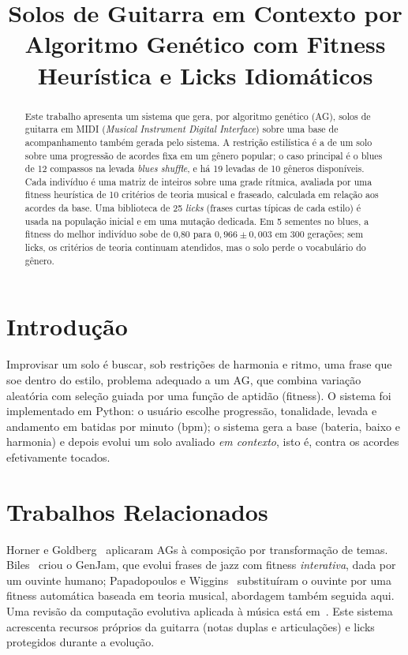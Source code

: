 \documentclass{article}
\title{Solos de Guitarra em Contexto por Algoritmo Genético com Fitness Heurística e Licks Idiomáticos}
\begin{document}
\maketitle

\begin{abstract}
Este trabalho apresenta um sistema que gera, por algoritmo genético (AG), solos de
guitarra em MIDI (\emph{Musical Instrument Digital Interface}) sobre uma base de
acompanhamento também gerada pelo sistema. A restrição estilística é
a de um solo sobre uma progressão de acordes fixa em um gênero popular; o caso principal
é o blues de 12 compassos na levada \emph{blues shuffle}, e há 19 levadas de 10 gêneros
disponíveis. Cada indivíduo é uma matriz de inteiros sobre uma grade rítmica, avaliada por uma
fitness heurística de 10 critérios de teoria musical e fraseado, calculada em relação
aos acordes da base. Uma biblioteca de 25 \emph{licks} (frases curtas típicas de
cada estilo) é usada na população inicial e em uma mutação dedicada. Em 5 sementes no
blues, a fitness do melhor indivíduo sobe de 0,80 para $0{,}966\pm0{,}003$ em 300
gerações; sem licks, os critérios de teoria continuam atendidos, mas o solo perde o
vocabulário do gênero.
\end{abstract}

\section{Introdução}\label{sec:introduction}

Improvisar um solo é buscar, sob restrições de harmonia e ritmo, uma frase que soe
dentro do estilo, problema adequado a um AG, que combina variação aleatória com seleção
guiada por uma função de aptidão (fitness). O sistema foi implementado em Python: o usuário escolhe progressão, tonalidade, levada e
andamento em batidas por minuto (bpm); o sistema gera a base (bateria, baixo e harmonia)
e depois evolui um solo avaliado \emph{em contexto}, isto é, contra os acordes
efetivamente tocados.

\section{Trabalhos Relacionados}

Horner e Goldberg~\cite{horner1991} aplicaram AGs à composição por transformação de
temas. Biles~\cite{biles1994} criou o GenJam, que evolui frases de jazz com fitness
\emph{interativa}, dada por um ouvinte humano; Papadopoulos e
Wiggins~\cite{papadopoulos1998} substituíram o ouvinte por uma fitness automática
baseada em teoria musical, abordagem também seguida aqui. Uma revisão da computação
evolutiva aplicada à música está em~\cite{miranda2007}. Este sistema acrescenta recursos próprios da guitarra (notas duplas e articulações) e
licks protegidos durante a evolução.
\end{document}
